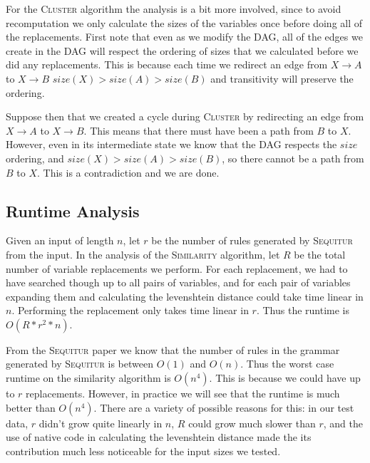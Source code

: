 \documentclass[11pt]{article}
\newcommand{\Sequitur}{\textsc{Sequitur}\xspace}
\newcommand{\Similarity}{\textsc{Similarity}\xspace}
\newcommand{\Cluster}{\textsc{Cluster}\xspace}
\begin{document}
For the \Cluster algorithm the analysis is a bit more involved, since to avoid
recomputation we only calculate the sizes of the variables once before doing
all of the replacements. First note that even as we modify the DAG, all of the
edges we create in the DAG will respect the ordering of sizes that we
calculated before we did any replacements. This is because each time we
redirect an edge from $X\rightarrow A$ to $X\rightarrow B$
$size(X)>size(A)>size(B)$ and transitivity will preserve the ordering.

Suppose then that we created a cycle during \Cluster by redirecting an edge from
$X \rightarrow A$ to $X \rightarrow B$.  This means that there must have been a
path from $B$ to $X$. However, even in its intermediate state we know that the
DAG respects the $size$ ordering, and $size(X) > size(A) > size(B)$, so there
cannot be a path from $B$ to $X$. This is a contradiction and we are done.

\subsection{Runtime Analysis}

Given an input of length $n$, let $r$ be the number of rules generated by
\Sequitur from the input.  In the analysis of the \Similarity algorithm, let $R$
be the total number of variable replacements we perform. For each replacement,
we had to have searched though up to all pairs of variables, and for each pair
of variables expanding them and calculating the levenshtein distance could take
time linear in $n$.  Performing the replacement only takes time linear in $r$.
Thus the runtime is $\boxed{O(R*r^2*n)}$.

From the \Sequitur paper \cite{sequitur} we know that the number of rules in
the grammar generated by \Sequitur is between $O(1)$ and $O(n)$. Thus the worst
case runtime on the similarity algorithm is $\boxed{O(n^4)}$. This is because
we could have up to $r$ replacements.  However, in practice we will see that
the runtime is much better than $O(n^4)$. There are a variety of possible
reasons for this: in our test data, $r$ didn't grow quite linearly in $n$, $R$
could grow much slower than $r$, and the use of native code in calculating the
levenshtein distance made the its contribution much less noticeable for the
input sizes we tested.
\end{document}

